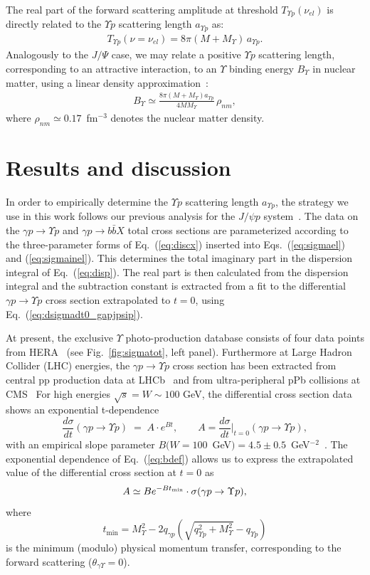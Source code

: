 \documentclass[10pt,prd,aps,nofootinbib,superscriptaddress]{revtex4}
\newcommand{\beq}{\begin{equation}}
\newcommand{\eeq}{\end{equation}}
\newcommand{\bea}{\begin{eqnarray}}
\newcommand{\eea}{\end{eqnarray}}
\begin{document}
The real part of the forward scattering amplitude at threshold $T_{\Upsilon p}(\nu_{el}) $ is directly related to the $\Upsilon p$ scattering length 
$a_{\Upsilon p}$ as:
\bea
T_{\Upsilon p}(\nu = \nu_{el}) = 8 \pi (M + M_\Upsilon) \, a_{\Upsilon p}. 
\eea
Analogously to the $J/\Psi$ case, 
we may relate a positive $\Upsilon p$ scattering length, corresponding to an attractive interaction, 
to an $\Upsilon$ binding energy $B_\Upsilon$ in nuclear matter, using a linear density approximation~\cite{Kaidalov:1992hd}:
\begin{eqnarray}
B_\Upsilon \simeq \frac{8 \pi (M + M_\Upsilon) a_{\Upsilon p}}{4 M M_\Upsilon} \, \rho_{nm},
\label{eq:nmbe}
\end{eqnarray}
where $\rho_{nm} \simeq 0.17$~fm$^{-3}$ denotes the nuclear matter density.



\section{Results and discussion}

In order to empirically determine the $\Upsilon p$ scattering length $a_{\Upsilon p}$, the strategy we use in this work follows our previous analysis for 
the $J/\psi p$ system~\cite{Gryniuk:2016mpk}. The data on the $\gamma p \to \Upsilon p$ and $\gamma p \to b \bar b X$ total cross sections 
are parameterized according to the three-parameter forms of Eq.~(\ref{eq:discx}) inserted into Eqs.~(\ref{eq:sigmael}) and (\ref{eq:sigmainel}).
This determines the total imaginary part in the dispersion integral of Eq.~(\ref{eq:disp}). The real part is then calculated from the dispersion integral  
and the subtraction constant is extracted from a fit to the differential $\gamma p \to \Upsilon p$ cross section extrapolated to $t = 0$, using Eq.~(\ref{eq:dsigmadt0_gapjpsip}).
 
At present, the exclusive $\Upsilon$ photo-production database
consists of four data points from HERA~\cite{Adloff:2000vm,Breitweg:1998ki,Chekanov:2009zz}
(see Fig.~\ref{fig:sigmatot}, left panel). 
Furthermore at Large Hadron Collider (LHC) energies, the $\gamma p \to \Upsilon p$ cross section has been extracted from central pp production data at LHCb~\cite{Aaij:2015kea} 
and from ultra-peripheral pPb collisions at  CMS~\cite{Sirunyan:2018sav}
For high energies $\sqrt{s} = W\sim100$ GeV, the differential cross section data shows an exponential t-dependence 
\beq
\frac{d \sigma}{dt} (\gamma p \to \Upsilon p)
\;=\; A \cdot e^{Bt}, \quad \quad 
A = \frac{d \sigma}{dt} \biggr|_{t = 0} (\gamma p \to \Upsilon p) ,
\label{eq:bdef}
\eeq
with an empirical slope parameter $B(W = 100$~GeV$)=4.5\pm0.5$~GeV$^{-2}$~\cite{Chekanov:2009zz}. 
The exponential dependence of Eq.~(\ref{eq:bdef}) allows us to express the extrapolated value
 of the differential cross section at $t=0$ as
\beq
A  \simeq B e^{- B t_{\rm min}} \cdot\sigma (\gamma p \to \Upsilon p),
\label{eq:brel}
\eeq
where
\beq
t_\mathrm{min} = M_\Upsilon^2 - 2q_{\gamma p} \left(\sqrt{q_{\Upsilon p}^2 + M_\Upsilon^2} - q_{\Upsilon p}\right)
\eeq
is the minimum (modulo) physical momentum transfer, corresponding to the forward scattering ($\theta_{\gamma \Upsilon}=0$).
\end{document}
